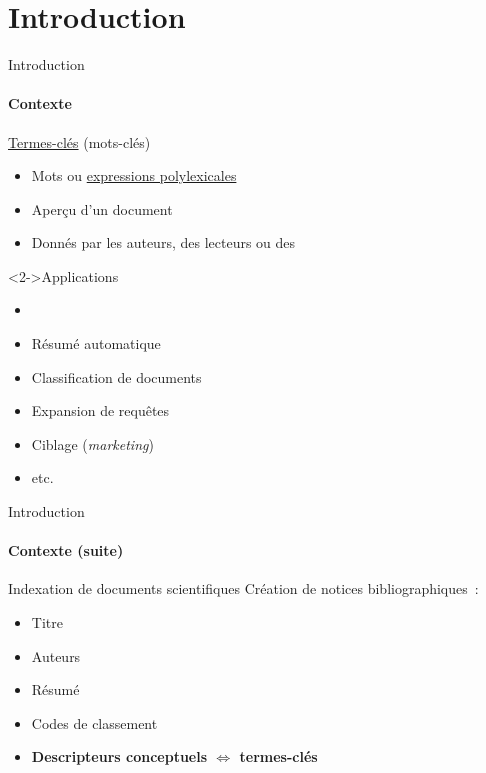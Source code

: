 \section*{Introduction}
  \begin{frame}{Introduction}
    \framesubtitle{Contexte}

    \begin{block}{\underline{Termes-clés} (mots-clés)}
      \begin{itemize}
        \item{Mots ou \underline{expressions polylexicales}}
        \item{Aperçu d'un document}
        \item{Donnés par les auteurs, des lecteurs ou des }
      \end{itemize}
    \end{block}

    \begin{block}<2->{Applications}
      \begin{minipage}{.5\linewidth}
        \begin{itemize}
          \item{}
          \item{Résumé automatique}
          \item{Classification de documents}
        \end{itemize}
      \end{minipage}\hfill
      \begin{minipage}{.48\linewidth}
        \begin{itemize}
          \item{Expansion de requêtes}
          \item{Ciblage (\textit{marketing})}
          \item{etc.}
        \end{itemize}
      \end{minipage}
    \end{block}
  \end{frame}

  \begin{frame}{Introduction}
    \framesubtitle{Contexte (suite)}

    \begin{block}{Indexation de documents scientifiques}
      Création de notices bibliographiques~:
      \begin{itemize}
        \item{Titre}
        \item{Auteurs}
        \item{Résumé}
        \item{Codes de classement}
        \item{\textbf{Descripteurs conceptuels $\Leftrightarrow$ termes-clés}}
      \end{itemize}
    \end{block}
  \end{frame}

